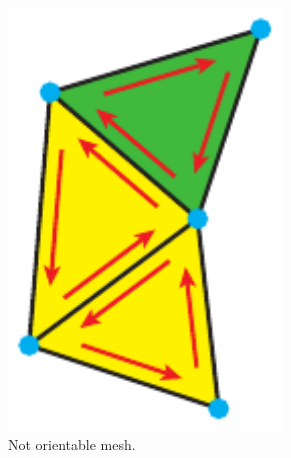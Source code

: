 \begin{description}
\begin{figure}[H]
\begin{subfigure}[b]{0.3\textwidth}
			\includegraphics[width=0.8\textwidth]{images/not_orientable}
			\caption{Not orientable mesh.}
			\label{fig:not_orientable}
		\end{subfigure}
		\begin{subfigure}[b]{0.3\textwidth}
			\centering

\end{subfigure}
\end{figure}
\end{description}
